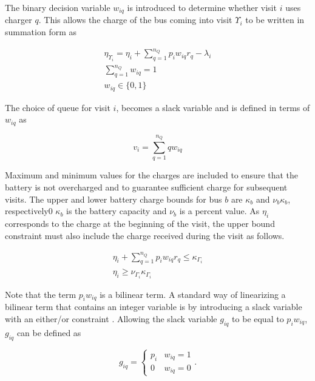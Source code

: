 \documentclass[11pt,a4paper,final]{article}
\begin{document}
The binary decision variable \(w_{iq}\) is introduced to determine whether visit \(i\) uses charger \(q\). This allows the
charge of the bus coming into visit \(\Upsilon_i\) to be written in summation form as

\begin{subequations}
    \label{subeq:pre_next_charge}
\begin{align}
    \eta_{\Upsilon_i} = \eta_i + \sum_{q=1}^{n_Q} p_i w_{iq} r_q - \lambda_i  \\
    \sum_{q=1}^{n_Q} w_{iq} = 1 \\
    w_{iq} \in \{0,1\}
\end{align}
\end{subequations}

The choice of queue for visit \(i\), becomes a slack variable and is defined in terms of \(w_{iq}\) as

\begin{equation}
    v_i = \sum_{q=1}^{n_Q} qw_{iq}
\end{equation}

Maximum and minimum values for the charges are included to ensure that the battery is not overcharged and to guarantee
sufficient charge for subsequent visits. The upper and lower battery charge bounds for bus \(b\) are \(\kappa_b\) and \(\nu_b \kappa_b\),
respectively0 \(\kappa_b\) is the battery capacity and \(\nu_b\) is a percent value. As \(\eta_i\) corresponds to the charge at the
beginning of the visit, the upper bound constraint must also include the charge received during the visit as follows.

\begin{subequations}
    \label{subeq:pre_min_max}
\begin{align}
    \eta_i + \sum_{q=1}^{n_Q} p_i w_{iq} r_q \leq \kappa_{\Gamma_i}                 \\
    \eta_i \geq \nu_{\Gamma_i} \kappa_{\Gamma_i}
\end{align}
\end{subequations}

Note that the term \(p_i w_{iq}\) is a bilinear term. A standard way of linearizing a bilinear term that contains an
integer variable is by introducing a slack variable with an either/or constraint \cite{Chen2010,Rodriguez2013}. Allowing
the slack variable \(g_{iq}\) to be equal to \(p_i w_{iq}\), \(g_{iq}\) can be defined as

\begin{equation}
    \label{eq:giq_cases}
    g_{iq} =
    \begin{cases}
        p_i & w_{iq} = 1 \\
        0 & w_{iq} = 0
    \end{cases}.
\end{equation}
\end{document}
